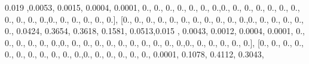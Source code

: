 \documentclass[
]{book}
\newenvironment{Shaded}{\begin{snugshade}}{\end{snugshade}}
\newcommand{\FloatTok}[1]{\textcolor[rgb]{0.00,0.00,0.81}{#1}}
\newcommand{\NormalTok}[1]{#1}
\begin{document}
\begin{Shaded}
\begin{Highlighting}[]
\FloatTok{0.019}\NormalTok{ ,}\FloatTok{0.0053}\NormalTok{, }\FloatTok{0.0015}\NormalTok{, }\FloatTok{0.0004}\NormalTok{, }\FloatTok{0.0001}\NormalTok{, }\FloatTok{0.}\NormalTok{, }\FloatTok{0.}\NormalTok{, }\FloatTok{0.}\NormalTok{, }\FloatTok{0.}\NormalTok{, }\FloatTok{0.}\NormalTok{, }\FloatTok{0.}\NormalTok{, }\FloatTok{0.}\NormalTok{,}\FloatTok{0.}\NormalTok{, }\FloatTok{0.}\NormalTok{, }\FloatTok{0.}\NormalTok{,}
\FloatTok{0.}\NormalTok{, }\FloatTok{0.}\NormalTok{, }\FloatTok{0.}\NormalTok{, }\FloatTok{0.}\NormalTok{, }\FloatTok{0.}\NormalTok{, }\FloatTok{0.}\NormalTok{, }\FloatTok{0.}\NormalTok{, }\FloatTok{0.}\NormalTok{,}\FloatTok{0.}\NormalTok{, }\FloatTok{0.}\NormalTok{, }\FloatTok{0.}\NormalTok{, }\FloatTok{0.}\NormalTok{, }\FloatTok{0.}\NormalTok{, }\FloatTok{0.}\NormalTok{], [}\FloatTok{0.}\NormalTok{, }\FloatTok{0.}\NormalTok{, }\FloatTok{0.}\NormalTok{, }\FloatTok{0.}\NormalTok{, }\FloatTok{0.}\NormalTok{, }\FloatTok{0.}\NormalTok{,}
\FloatTok{0.}\NormalTok{, }\FloatTok{0.}\NormalTok{, }\FloatTok{0.}\NormalTok{, }\FloatTok{0.}\NormalTok{, }\FloatTok{0.}\NormalTok{,}\FloatTok{0.}\NormalTok{, }\FloatTok{0.}\NormalTok{, }\FloatTok{0.}\NormalTok{, }\FloatTok{0.}\NormalTok{, }\FloatTok{0.}\NormalTok{, }\FloatTok{0.}\NormalTok{, }\FloatTok{0.0424}\NormalTok{, }\FloatTok{0.3654}\NormalTok{, }\FloatTok{0.3618}\NormalTok{, }\FloatTok{0.1581}\NormalTok{,}
\FloatTok{0.0513}\NormalTok{,}\FloatTok{0.015}\NormalTok{ , }\FloatTok{0.0043}\NormalTok{, }\FloatTok{0.0012}\NormalTok{, }\FloatTok{0.0004}\NormalTok{, }\FloatTok{0.0001}\NormalTok{, }\FloatTok{0.}\NormalTok{, }\FloatTok{0.}\NormalTok{, }\FloatTok{0.}\NormalTok{, }\FloatTok{0.}\NormalTok{, }\FloatTok{0.}\NormalTok{, }\FloatTok{0.}\NormalTok{,}\FloatTok{0.}\NormalTok{, }\FloatTok{0.}\NormalTok{,}
\FloatTok{0.}\NormalTok{, }\FloatTok{0.}\NormalTok{, }\FloatTok{0.}\NormalTok{, }\FloatTok{0.}\NormalTok{, }\FloatTok{0.}\NormalTok{, }\FloatTok{0.}\NormalTok{, }\FloatTok{0.}\NormalTok{, }\FloatTok{0.}\NormalTok{, }\FloatTok{0.}\NormalTok{,}\FloatTok{0.}\NormalTok{, }\FloatTok{0.}\NormalTok{, }\FloatTok{0.}\NormalTok{, }\FloatTok{0.}\NormalTok{, }\FloatTok{0.}\NormalTok{, }\FloatTok{0.}\NormalTok{], [}\FloatTok{0.}\NormalTok{, }\FloatTok{0.}\NormalTok{, }\FloatTok{0.}\NormalTok{, }\FloatTok{0.}\NormalTok{, }\FloatTok{0.}\NormalTok{,}
\FloatTok{0.}\NormalTok{, }\FloatTok{0.}\NormalTok{, }\FloatTok{0.}\NormalTok{, }\FloatTok{0.}\NormalTok{, }\FloatTok{0.}\NormalTok{, }\FloatTok{0.}\NormalTok{,}\FloatTok{0.}\NormalTok{, }\FloatTok{0.}\NormalTok{, }\FloatTok{0.}\NormalTok{, }\FloatTok{0.}\NormalTok{, }\FloatTok{0.}\NormalTok{, }\FloatTok{0.}\NormalTok{, }\FloatTok{0.0001}\NormalTok{, }\FloatTok{0.1078}\NormalTok{, }\FloatTok{0.4112}\NormalTok{, }\FloatTok{0.3043}\NormalTok{,}

\end{Highlighting}
\end{Shaded}
\end{document}
